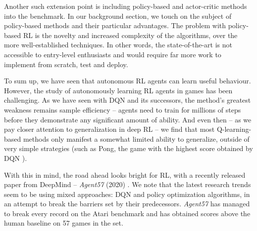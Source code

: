 Another such extension point is including policy-based and actor-critic methods into the benchmark.
In our background section, we touch on the subject of policy-based methods and their particular advantages.
The problem with policy-based RL is the novelty and increased complexity of the algorithms, over the more well-established techniques.
In other words, the state-of-the-art is not accessible to entry-level enthusiasts and would require far more work to implement from scratch, test and deploy.

To sum up, we have seen that autonomous RL agents can learn useful behaviour.
However, the study of autonomously learning RL agents in games has been challenging.
As we have seen with DQN and its successors, the method's greatest weakness remains sample efficiency -- agents need to train for millions of steps before they demonstrate any significant amount of ability.
And even then -- as we pay closer attention to generalization in deep RL -- we find that most Q-learning-based methods only manifest a somewhat limited ability to generalize, outside of very simple strategies (such as Pong, the game with the highest score obtained by DQN \cite{atari-dqn}).

With this in mind, the road ahead looks bright for RL, with a recently released paper from DeepMind – \emph{Agent57} (2020) \cite{agent57-paper}. We note that the latest research trends seem to be using mixed approaches: DQN and policy optimization algorithms, in an attempt to break the barriers set by their predecessors.
\emph{Agent57} has managed to break every record on the Atari benchmark and has obtained scores above the human baseline on 57 games in the set.